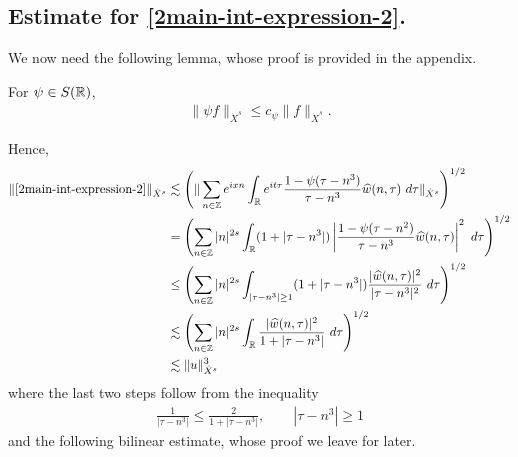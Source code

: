 \subsection{Estimate for \eqref{2main-int-expression-2}.}
We now need the following lemma, whose proof is provided in the appendix.
%
%
%
%
%
%
%
%
\begin{lemma}
\label{2lem:schwartz-mult}
	For $\psi \in S(\mathbb{R})$,
%
%
\begin{equation}
	\label{2schwartz-mult}
	\begin{split}
		\|\psi f \|_{\dot{X}^s} \le c_{\psi} \|f \|_{\dot{X}^s}.
	\end{split}
\end{equation}
%
%
\end{lemma}
%
%
Hence,
%
%
\begin{equation}
	\label{2main-int2-est-X-s-part}
	\begin{split}
		\|\eqref{2main-int-expression-2}\|_{\dot{X}^s} 
		& \lesssim 
		\left( \| \sum_{n \in \zz} e^{ixn} \int_\rr 
		e^{it \tau} \frac{1 - \psi (\tau - n^{3} ) 
		}{\tau - n^{3}} \wh{w}(n, \tau) \ 
		d \tau\|_{\dot{X}^s} \right)^{1/2}
		\\
		& =  \left( \sum_{n \in \zz} |n|^{2s} \int_\rr
		(1 + |\tau - n^{3}|) \left | \frac{1 - \psi(\tau - n^{2 
		})}{\tau - n^{3}} 
		\wh{w}(n, \tau) \right |^2 \ d 
		\tau \right)^{1/2}
		\\
		& \le \left( \sum_{n \in \zz} |n|^{2s} \int_{| \tau - n^3| \ge 1}
		(1 + |\tau - n^{3}|) \frac{|\wh{w}(n, \tau)|^2 }{|\tau - n^3|^2} 
		\ d 
		\tau \right)^{1/2}
		\\
		& \lesssim  \left( \sum_{n \in 
		\zz} |n|^{2s} \int_\rr
		\frac{|\wh{w}(n, \tau) |^2}{1+ |\tau - 
		n^{3}|} 
		 \ d \tau 
		\right)^{1/2}
		\\
		& \lesssim  \|u\|_{\dot{X}^s}^3
	\end{split}
\end{equation}
%
%
where the last two steps follow from the inequality 
%
\begin{equation}
	\label{2one-plus-ineq}
	\begin{split}
		\frac{1}{|\tau - n^{3}| } \le \frac{2}{1 + |\tau - n^{3}| }, 
		\qquad |\tau - n^{3}| \ge 1
	\end{split}
\end{equation}
%
%
and the following bilinear estimate, whose proof we leave for later.
%
